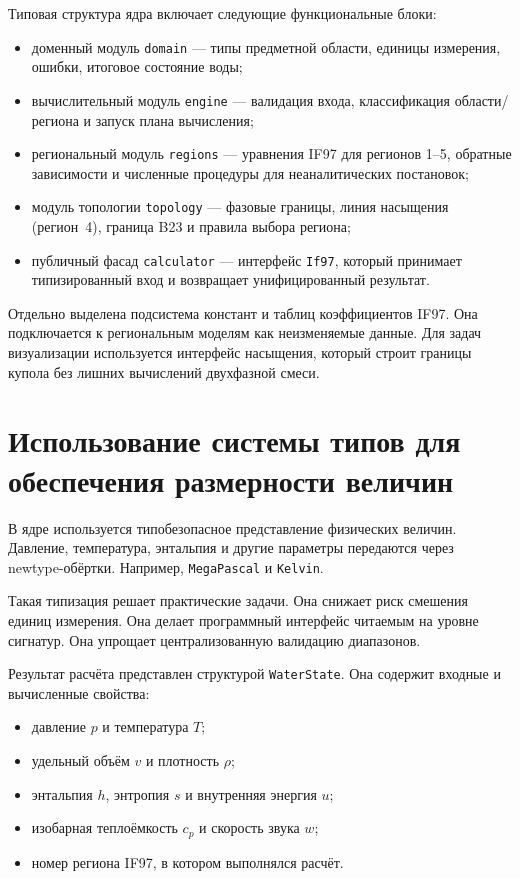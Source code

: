 Типовая структура ядра включает следующие функциональные блоки:
\begin{itemize}
\item доменный модуль \texttt{domain} --- типы предметной области, единицы измерения, ошибки, итоговое состояние воды;
\item вычислительный модуль \texttt{engine} --- валидация входа, классификация области/региона и запуск плана вычисления;
\item региональный модуль \texttt{regions} --- уравнения IF97 для регионов 1--5, обратные зависимости и численные процедуры для неаналитических постановок;
\item модуль топологии \texttt{topology} --- фазовые границы, линия насыщения (регион~4), граница B23 и правила выбора региона;
\item публичный фасад \texttt{calculator} --- интерфейс \texttt{If97}, который принимает типизированный вход и возвращает унифицированный результат.
\end{itemize}

Отдельно выделена подсистема констант и таблиц коэффициентов IF97.
Она подключается к региональным моделям как неизменяемые данные.
Для задач визуализации используется интерфейс насыщения,
который строит границы купола без лишних вычислений двухфазной смеси.

\section{Использование системы типов для обеспечения размерности величин}

В ядре используется типобезопасное представление физических величин.
Давление, температура, энтальпия и другие параметры
передаются через newtype-обёртки.
Например, \texttt{MegaPascal} и \texttt{Kelvin}.

Такая типизация решает практические задачи.
Она снижает риск смешения единиц измерения.
Она делает программный интерфейс читаемым на уровне сигнатур.
Она упрощает централизованную валидацию диапазонов.

Результат расчёта представлен структурой \texttt{WaterState}.
Она содержит входные и вычисленные свойства:
\begin{itemize}
\item давление $p$ и температура $T$;
\item удельный объём $v$ и плотность $\rho$;
\item энтальпия $h$, энтропия $s$ и внутренняя энергия $u$;
\item изобарная теплоёмкость $c_p$ и скорость звука $w$;
\item номер региона IF97, в котором выполнялся расчёт.
\end{itemize}


